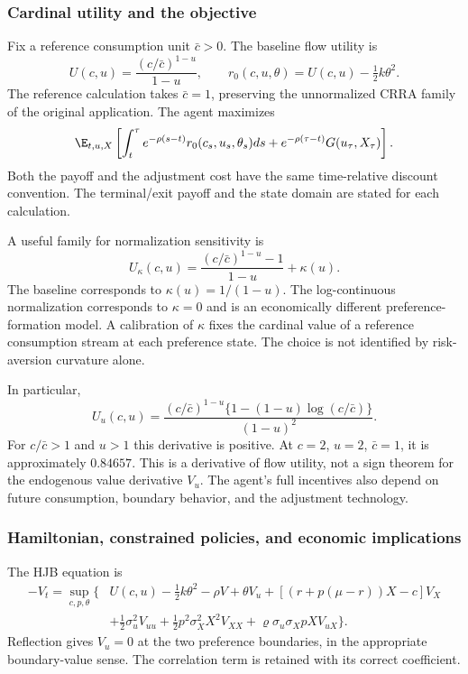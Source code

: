 \subsubsection{Cardinal utility and the objective}
Fix a reference consumption unit $\bar c>0$. The baseline flow utility is
\begin{equation}\label{eq:nduutility}
 U(c,u)=\frac{(c/\bar c)^{1-u}}{1-u},\qquad
 r_0(c,u,\theta)=U(c,u)-\tfrac12 k\theta^2.
\end{equation}
The reference calculation takes $\bar c=1$, preserving the unnormalized CRRA family of the original application. The agent maximizes
\begin{equation}\label{eq:nduobjective}
 \E_{t,u,X}\left[\int_t^\tau e^{-\rho(s-t)}r_0(c_s,u_s,\theta_s)ds
        +e^{-\rho(\tau-t)}G(u_\tau,X_\tau)\right].
\end{equation}
Both the payoff and the adjustment cost have the same time-relative discount convention. The terminal/exit payoff and the state domain are stated for each calculation.

A useful family for normalization sensitivity is
\[
 U_\kappa(c,u)=\frac{(c/\bar c)^{1-u}-1}{1-u}+\kappa(u).
\]
The baseline corresponds to $\kappa(u)=1/(1-u)$. The log-continuous normalization corresponds to $\kappa=0$ and is an economically different preference-formation model. A calibration of $\kappa$ fixes the cardinal value of a reference consumption stream at each preference state. The choice is not identified by risk-aversion curvature alone.

In particular,
\begin{equation}\label{eq:uderivative}
 U_u(c,u)=\frac{(c/\bar c)^{1-u}\{1-(1-u)\log(c/\bar c)\}}{(1-u)^2}.
\end{equation}
For $c/\bar c>1$ and $u>1$ this derivative is positive. At $c=2$, $u=2$, $\bar c=1$, it is approximately $0.84657$. This is a derivative of flow utility, not a sign theorem for the endogenous value derivative $V_u$. The agent's full incentives also depend on future consumption, boundary behavior, and the adjustment technology.

\subsubsection{Hamiltonian, constrained policies, and economic implications}
The HJB equation is
\begin{align}\label{eq:nduhjb}
 -V_t=\sup_{c,p,\theta}\big\{&U(c,u)-\tfrac12 k\theta^2-\rho V
 +\theta V_u+[(r+p(\mu-r))X-c]V_X\nonumber\\
 &+\tfrac12\sigma_u^2V_{uu}+\tfrac12p^2\sigma_X^2X^2V_{XX}
 +\varrho\sigma_u\sigma_X pX V_{uX}\big\}.
\end{align}
Reflection gives $V_u=0$ at the two preference boundaries, in the appropriate boundary-value sense. The correlation term is retained with its correct coefficient.

